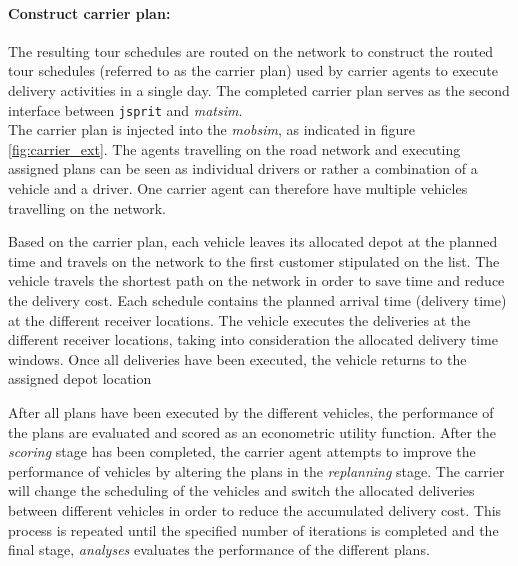 \paragraph{Construct carrier plan:} The resulting tour schedules are routed on the network to construct the routed tour schedules (referred to as the carrier plan) used by carrier agents to execute delivery activities in a single day. The completed carrier plan serves as the second interface between \texttt{jsprit} and \textit{matsim}. \\


The carrier plan is injected into the \textit{mobsim}, as indicated in figure \ref{fig:carrier_ext}. The agents travelling on the road network and executing assigned plans can be seen as individual drivers or rather a combination of a vehicle and a driver. One carrier agent can therefore have multiple vehicles travelling on the network.\par

Based on the carrier plan, each vehicle leaves its allocated depot at the planned time and travels on the network to the first customer stipulated on the list. The vehicle travels the shortest path on the network in order to save time and reduce the delivery cost. Each schedule contains the planned arrival time (delivery time) at the different receiver locations. The vehicle executes the deliveries at the different receiver locations, taking into consideration the allocated delivery time windows. Once all deliveries have been executed, the vehicle returns to the assigned depot location \par

After all plans have been executed by the different vehicles, the performance of the plans are evaluated and scored as an econometric utility function. After the \textit{scoring} stage has been completed, the carrier agent attempts to improve the performance of vehicles by altering the plans in the \textit{replanning} stage. The carrier will change the scheduling of the vehicles and switch the allocated deliveries between different vehicles in order to reduce the accumulated delivery cost. This process is repeated until the specified number of iterations is completed and the final stage, \textit{analyses} evaluates the performance of the different plans.

